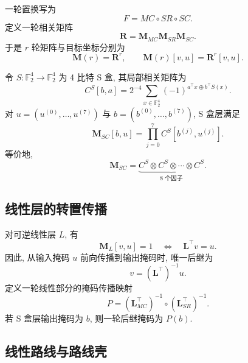 \documentclass[UTF8,a4paper,zihao=-4,fontset=fandol]{ctexart}
\numberwithin{equation}{section}
\theoremstyle{definition}
\theoremstyle{plain}
\theoremstyle{remark}
\begin{document}
一轮置换写为
\begin{equation}
F=MC\circ SR\circ SC.
\label{eq:round-function}
\end{equation}
定义一轮相关矩阵
\begin{equation}
\bm{R}=\bm{M}_{MC}\bm{M}_{SR}\bm{M}_{SC}.
\label{eq:round-matrix}
\end{equation}
于是 $r$ 轮矩阵与目标坐标分别为
\begin{equation}
\bm{M}(r)=\bm{R}^{r},\qquad \bm{M}(r)[v,u]=\bm{R}^{r}[v,u].
\label{eq:r-round}
\end{equation}

令 $S:\mathbb F_2^4\to\mathbb F_2^4$ 为 4 比特 S 盒, 其局部相关矩阵为
\begin{equation}
C^S[b,a]=2^{-4}\sum_{x\in\mathbb F_2^4}(-1)^{a^\top x\oplus b^\top S(x)}.
\label{eq:local-lat}
\end{equation}
对 $u=(u^{(0)},\ldots,u^{(7)})$ 与 $b=(b^{(0)},\ldots,b^{(7)})$, S 盒层满足
\begin{equation}
\bm{M}_{SC}[b,u]=\prod_{j=0}^{7}C^S[b^{(j)},u^{(j)}].
\label{eq:sc-product}
\end{equation}
等价地,
\begin{equation}
\bm{M}_{SC}=\underbrace{C^S\otimes C^S\otimes\cdots\otimes C^S}_{8\text{ 个因子}}.
\label{eq:kronecker}
\end{equation}

\subsection{线性层的转置传播}

对可逆线性层 $L$, 有
\begin{equation}
\bm{M}_{L}[v,u]=1\quad\Longleftrightarrow\quad \bm{L}^{\top}v=u.
\label{eq:linear-mask}
\end{equation}
因此, 从输入掩码 $u$ 前向传播到输出掩码时, 唯一后继为
\begin{equation}
v=(\bm{L}^{\top})^{-1}u.
\label{eq:forward-mask}
\end{equation}
定义一轮线性部分的掩码传播映射
\begin{equation}
P=(\bm{L}_{MC}^{\top})^{-1}\circ(\bm{L}_{SR}^{\top})^{-1}.
\label{eq:P-map}
\end{equation}
若 S 盒层输出掩码为 $b$, 则一轮后继掩码为 $P(b)$.

\subsection{线性路线与路线壳}
\end{document}
